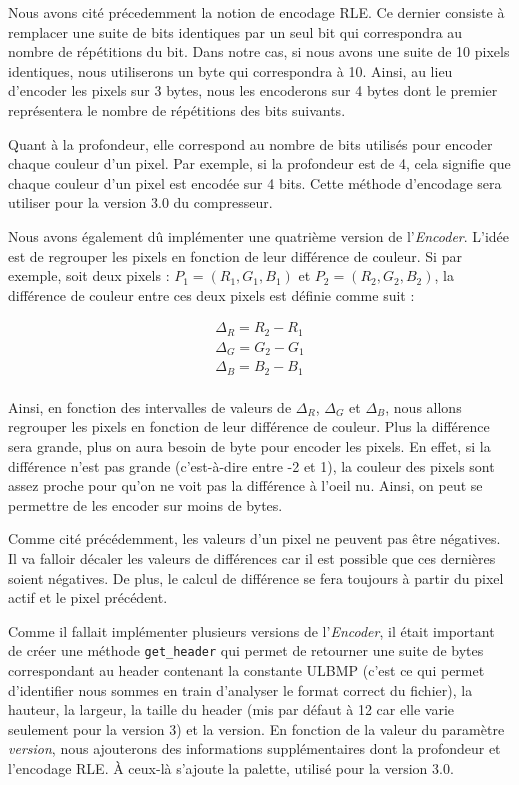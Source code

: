 \documentclass[utf8]{article}
\begin{document}
Nous avons cité précedemment la notion de encodage RLE. Ce dernier consiste à remplacer une suite de bits identiques par un seul bit qui correspondra au nombre de répétitions du bit. Dans notre cas, si nous avons une suite de 10 pixels identiques, nous utiliserons un byte qui correspondra à 10. Ainsi, au lieu d'encoder les pixels sur 3 bytes, nous les encoderons sur 4 bytes dont le premier représentera le nombre de répétitions des bits suivants.

Quant à la profondeur, elle correspond au nombre de bits utilisés pour encoder chaque couleur d'un pixel. Par exemple, si la profondeur est de 4, cela signifie que chaque couleur d'un pixel est encodée sur 4 bits. Cette méthode d'encodage sera utiliser pour la version 3.0 du compresseur. 

Nous avons également dû implémenter une quatrième  version de l'\textit{Encoder}. L'idée est de regrouper les pixels en fonction de leur différence de couleur. Si par exemple, soit deux pixels : $P_1 = (R_1, G_1, B_1)$ et $P_2 = (R_2, G_2, B_2)$, la différence de couleur entre ces deux pixels est définie comme suit : 

\begin{align*}
		\Delta_R = R_2 - R_1 \\
		\Delta_G = G_2 - G_1 \\
		\Delta_B =  B_2 - B_1 \\
\end{align*}

Ainsi, en fonction des intervalles de valeurs de $\Delta_R$, $\Delta_G$ et $\Delta_B$, nous allons regrouper les pixels en fonction de leur différence de couleur. Plus la différence sera grande, plus on aura besoin de byte pour encoder les pixels. En effet, si la différence n'est pas grande (c'est-à-dire entre -2 et 1), la couleur des pixels sont assez proche pour qu'on ne voit pas la différence à l'oeil nu. Ainsi, on peut se permettre de les encoder sur moins de bytes.

Comme cité précédemment, les valeurs d'un pixel ne peuvent pas être négatives. Il va falloir décaler les valeurs de différences car il est possible que ces dernières soient négatives. De plus, le calcul de différence se fera toujours à partir du pixel actif et le pixel précédent.

Comme il fallait implémenter plusieurs versions de l'\textit{Encoder}, il était important de créer une méthode \texttt{get_header} qui permet de retourner une suite de bytes correspondant au header contenant la constante ULBMP (c'est ce qui permet d'identifier nous sommes en train d'analyser le format correct du fichier), la hauteur, la largeur, la taille du header (mis par défaut à 12 car elle varie seulement pour la version 3) et la version. En fonction de la valeur du paramètre \textit{version}, nous ajouterons des informations supplémentaires dont la profondeur et l'encodage RLE. À ceux-là s'ajoute la palette, utilisé pour la version 3.0.
\end{document}
